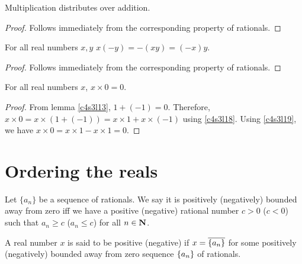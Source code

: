 \begin{lem}\label{c4s3l18}
Multiplication distributes over addition.
\end{lem}
\begin{proof}
Follows immediately from the corresponding property of rationals.
\end{proof}

\begin{lem}\label{c4s3l19}
For all real numbers $x, y$ $x(-y) = -(xy) = (-x)y$.
\end{lem}
\begin{proof}
Follows immediately from the corresponding property of rationals.
\end{proof}

\begin{lem}\label{c4s3l20}
For all real numbers $x$, $x \times 0 = 0$.
\end{lem}
\begin{proof}
From lemma \ref{c4s3l13}, $1 + (-1) = 0$. Therefore, $x \times 0 =
x \times (1 + (-1)) = x \times 1 + x \times (-1)$ using \ref{c4s3l18}.
Using \ref{c4s3l19}, we have $x \times 0 = x \times 1 - x \times 1 = 0$.
\end{proof}

\section{Ordering the reals}\label{c4s4}
\begin{defn}\label{c4s4d1}
Let $\{a_n\}$ be a sequence of rationals. We say it is positively 
(negatively) bounded away from zero iff we have a positive (negative)
rational number $c > 0$ ($c < 0$) such that $a_n \ge c$ ($a_n \le c$)
for all $n \in \mathbf{N}$.
\end{defn}

\begin{defn}\label{c4s4d2}
A real number $x$ is said to be positive (negative) if $x = 
\overline{\{a_n\}}$ for some positively (negatively) bounded away from
zero sequence $\{a_n\}$ of rationals.
\end{defn}

